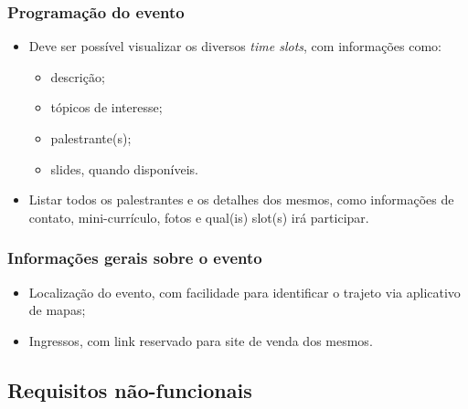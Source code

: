 \documentclass[12pt,a4paper,twoside,hyphens,english,brazil]{abntex2}
\begin{document}
\subsubsection*{Programação do evento}
\begin{itemize}
	\item Deve ser possível visualizar os diversos \emph{time slots}, com informações como:
		\begin{itemize}
			\item descrição;
			\item tópicos de interesse;
			\item palestrante(s);
			\item slides, quando disponíveis.
		\end{itemize}
	\item Listar todos os palestrantes e os detalhes dos mesmos, como informações de contato, mini-currículo, fotos e qual(is) slot(s) irá participar.
\end{itemize}

\subsubsection*{Informações gerais sobre o evento}
\begin{itemize}
	\item Localização do evento, com facilidade para identificar o trajeto via aplicativo de mapas;
	\item Ingressos, com link reservado para site de venda dos mesmos.
\end{itemize}

\subsection{Requisitos não-funcionais}
\end{document}
